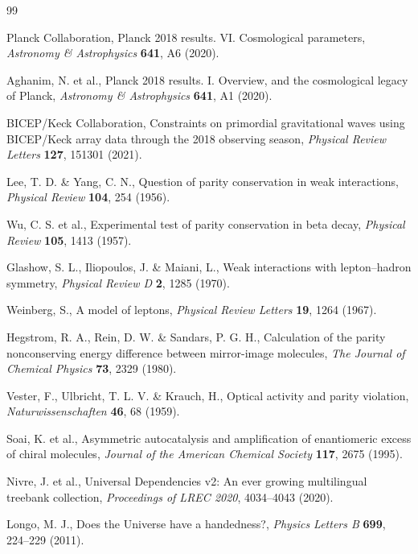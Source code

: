 \documentclass[twocolumn,11pt,a4paper]{article}
\begin{document}
\begin{thebibliography}{99}

Planck Collaboration, Planck 2018 results. VI. Cosmological parameters, \textit{Astronomy \& Astrophysics} \textbf{641}, A6 (2020).

Aghanim, N. et al., Planck 2018 results. I. Overview, and the cosmological legacy of Planck, \textit{Astronomy \& Astrophysics} \textbf{641}, A1 (2020).

BICEP/Keck Collaboration, Constraints on primordial gravitational waves using BICEP/Keck array data through the 2018 observing season, \textit{Physical Review Letters} \textbf{127}, 151301 (2021).

Lee, T. D. \& Yang, C. N., Question of parity conservation in weak interactions, \textit{Physical Review} \textbf{104}, 254 (1956).

Wu, C. S. et al., Experimental test of parity conservation in beta decay, \textit{Physical Review} \textbf{105}, 1413 (1957).

Glashow, S. L., Iliopoulos, J. \& Maiani, L., Weak interactions with lepton--hadron symmetry, \textit{Physical Review D} \textbf{2}, 1285 (1970).

Weinberg, S., A model of leptons, \textit{Physical Review Letters} \textbf{19}, 1264 (1967).

Hegstrom, R. A., Rein, D. W. \& Sandars, P. G. H., Calculation of the parity nonconserving energy difference between mirror-image molecules, \textit{The Journal of Chemical Physics} \textbf{73}, 2329 (1980).

Vester, F., Ulbricht, T. L. V. \& Krauch, H., Optical activity and parity violation, \textit{Naturwissenschaften} \textbf{46}, 68 (1959).

Soai, K. et al., Asymmetric autocatalysis and amplification of enantiomeric excess of chiral molecules, \textit{Journal of the American Chemical Society} \textbf{117}, 2675 (1995).

Nivre, J. et al., Universal Dependencies v2: An ever growing multilingual treebank collection, \textit{Proceedings of LREC 2020}, 4034--4043 (2020).

Longo, M. J., Does the Universe have a handedness?, \textit{Physics Letters B} \textbf{699}, 224--229 (2011).


\end{thebibliography}
\end{document}
